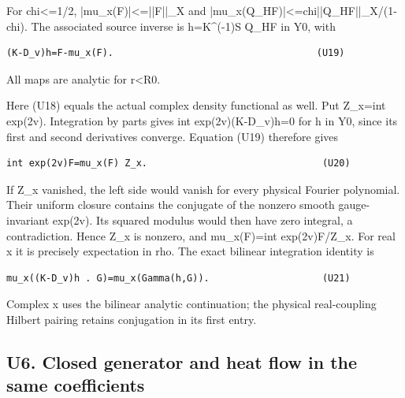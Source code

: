 \documentclass[11pt,a4paper]{article}
\renewcommand{\[}{\begingroup\small\originaldisplaystart}
\renewcommand{\]}{\originaldisplayend\endgroup}
\begin{document}
For chi\textless=1/2,
{|\allowbreak{}m\allowbreak{}u\allowbreak{}\_\allowbreak{}x\allowbreak{}(\allowbreak{}F\allowbreak{})\allowbreak{}|\allowbreak{}\textless{}\allowbreak{}=\allowbreak{}|\allowbreak{}|\allowbreak{}F\allowbreak{}|\allowbreak{}|\allowbreak{}\_\allowbreak{}X\allowbreak{}}
and
{|\allowbreak{}m\allowbreak{}u\allowbreak{}\_\allowbreak{}x\allowbreak{}(\allowbreak{}Q\allowbreak{}\_\allowbreak{}H\allowbreak{}F\allowbreak{})\allowbreak{}|\allowbreak{}\textless{}\allowbreak{}=\allowbreak{}c\allowbreak{}h\allowbreak{}i\allowbreak{}|\allowbreak{}|\allowbreak{}Q\allowbreak{}\_\allowbreak{}H\allowbreak{}F\allowbreak{}|\allowbreak{}|\allowbreak{}\_\allowbreak{}X\allowbreak{}/\allowbreak{}(\allowbreak{}1\allowbreak{}-\allowbreak{}c\allowbreak{}h\allowbreak{}i\allowbreak{})\allowbreak{}.\allowbreak{}}
The associated source inverse is h=K\^{}(-1)S Q\_HF in Y0, with

\begin{verbatim}
(K-D_v)h=F-mu_x(F).                                    (U19)
\end{verbatim}

All maps are analytic for r\textless R0.

Here (U18) equals the actual complex density functional as well. Put
Z\_x=int exp(2v). Integration by parts gives int exp(2v)(K-D\_v)h=0 for
h in Y0, since its first and second derivatives converge. Equation (U19)
therefore gives

\begin{verbatim}
int exp(2v)F=mu_x(F) Z_x.                               (U20)
\end{verbatim}

If Z\_x vanished, the left side would vanish for every physical Fourier
polynomial. Their uniform closure contains the conjugate of the nonzero
smooth gauge-invariant exp(2v). Its squared modulus would then have zero
integral, a contradiction. Hence Z\_x is nonzero, and mu\_x(F)=int
exp(2v)F/Z\_x. For real x it is precisely expectation in rho. The exact
bilinear integration identity is

\begin{verbatim}
mu_x((K-D_v)h . G)=mu_x(Gamma(h,G)).                    (U21)
\end{verbatim}

Complex x uses the bilinear analytic continuation; the physical
real-coupling Hilbert pairing retains conjugation in its first entry.

\subsection{U6. Closed generator and heat flow in the same
coefficients}\label{u6.-closed-generator-and-heat-flow-in-the-same-coefficients}
\end{document}
